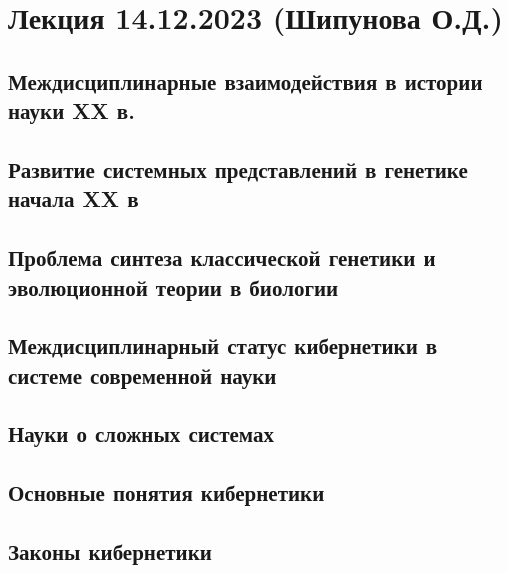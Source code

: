 \documentclass[main.tex]{subfiles}
\begin{document}
\section{Лекция 14.12.2023 (Шипунова О.Д.)}


\subsection{Междисциплинарные взаимодействия в истории науки XX в.}


\subsection{Развитие системных представлений в генетике начала XX в}


\subsection{Проблема синтеза классической генетики и эволюционной теории в биологии}


\subsection{Междисциплинарный статус кибернетики в системе современной науки}


\subsection{Науки о сложных системах}


\subsection{Основные понятия кибернетики}




\subsection{Законы кибернетики}
\end{document}
